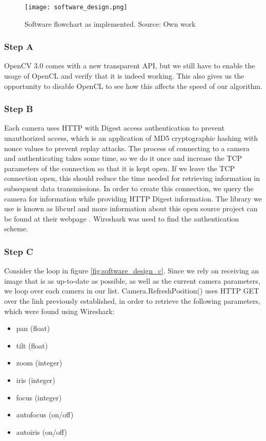 \begin{figure}[ht]
    \centering
    \texttt{[image: software\_design.png]}
    \caption{Software flowchart as implemented. Source: Own work}
    \label{fig:software_design}
\end{figure}
\FloatBarrier

\subsubsection{Step A}
OpenCV 3.0 comes with a new transparent API, but we still have to enable the usage of OpenCL and verify that it is indeed working. This also gives us the opportunity to disable OpenCL to see how this affects the speed of our algorithm.
\subsubsection{Step B}
Each camera uses HTTP with Digest access authentication to prevent unauthorized access, which is an application of MD5 cryptographic hashing with nonce values to prevent replay attacks. The process of connecting to a camera and authenticating takes some time, so we do it once and increase the TCP parameters of the connection so that it is kept open. If we leave the TCP connection open, this should reduce the time needed for retrieving information in subsequent data transmissions. In order to create this connection, we query the camera for information while providing HTTP Digest information. The library we use is known as libcurl and more information about this open source project can be found at their webpage \citet{curl15}. Wireshark was used to find the authentication scheme.
\subsubsection{Step C}
Consider the loop in figure \ref{fig:software_design_c}.
Since we rely on receiving an image that is as up-to-date as possible, as well as the current camera parameters, we loop over each camera in our list. Camera.RefreshPosition() uses HTTP GET over the link previously established, in order to retrieve the following parameters, which were found using Wireshark:

\begin{itemize}
\item pan (float)
\item tilt (float)
\item zoom (integer)
\item iris (integer)
\item focus (integer)
\item autofocus (on/off)
\item autoiris (on/off)
\end{itemize}

